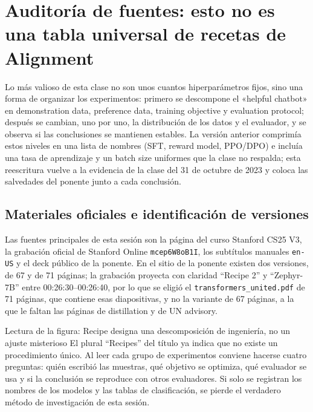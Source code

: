 \section{Auditoría de fuentes: esto no es una tabla universal de recetas de Alignment}

Lo más valioso de esta clase no son unos cuantos hiperparámetros fijos, sino una forma de organizar los experimentos: primero se descompone el «helpful chatbot» en demonstration data, preference data, training objective y evaluation protocol; después se cambian, uno por uno, la distribución de los datos y el evaluador, y se observa si las conclusiones se mantienen estables. La versión anterior comprimía estos niveles en una lista de nombres (SFT, reward model, PPO/DPO) e incluía una tasa de aprendizaje y un batch size uniformes que la clase no respalda; esta reescritura vuelve a la evidencia de la clase del 31 de octubre de 2023 y coloca las salvedades del ponente junto a cada conclusión.

\subsection{Materiales oficiales e identificación de versiones}

Las fuentes principales de esta sesión son la página del curso Stanford CS25 V3, la grabación oficial de Stanford Online \texttt{mcep6W8oB1I}, los subtítulos manuales \texttt{en-US} y el deck público de la ponente. En el sitio de la ponente existen dos versiones, de 67 y de 71 páginas; la grabación proyecta con claridad ``Recipe 2'' y ``Zephyr-7B'' entre 00:26:30--00:26:40, por lo que se eligió el \texttt{transformers\_united.pdf} de 71 páginas, que contiene esas diapositivas, y no la variante de 67 páginas, a la que le faltan las páginas de distillation y de UN advisory.


\begin{knowledgebox}{Lectura de la figura: Recipe designa una descomposición de ingeniería, no un ajuste misterioso}
El plural ``Recipes'' del título ya indica que no existe un procedimiento único. Al leer cada grupo de experimentos conviene hacerse cuatro preguntas: quién escribió las muestras, qué objetivo se optimiza, qué evaluador se usa y si la conclusión se reproduce con otros evaluadores. Si solo se registran los nombres de los modelos y las tablas de clasificación, se pierde el verdadero método de investigación de esta sesión.
\end{knowledgebox}

